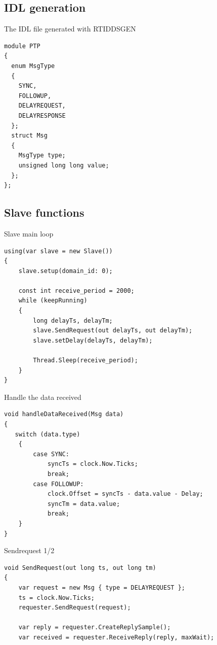 \documentclass[compressed, presentation, notheorems, 12pt]{beamer}
\begin{document}
\subsection{IDL generation}
	\begin{frame}[containsverbatim]{The IDL file generated  with RTIDDSGEN}

	\begin{lstlisting}[style=Code-C++]
module PTP
{
  enum MsgType
  {
    SYNC,
    FOLLOWUP,
    DELAYREQUEST,
    DELAYRESPONSE
  };
  struct Msg
  {
    MsgType type;         
    unsigned long long value;     
  };
};
	\end{lstlisting}
	\end{frame}



\subsection{Slave functions}

	\begin{frame}[containsverbatim]{Slave main loop}
	
	\begin{lstlisting}[style=Code-C++]
using(var slave = new Slave())
{
	slave.setup(domain_id: 0);
	
	const int receive_period = 2000; 
	while (keepRunning)
	{
		long delayTs, delayTm;
		slave.SendRequest(out delayTs, out delayTm);
		slave.setDelay(delayTs, delayTm);

		Thread.Sleep(receive_period);
	}
}
	\end{lstlisting}

	\end{frame}




	\begin{frame}[containsverbatim]{Handle the data received}
	\begin{lstlisting}[style=Code-C++]
void handleDataReceived(Msg data)
{
   switch (data.type)
	{
		case SYNC:
			syncTs = clock.Now.Ticks;
			break;
		case FOLLOWUP:
			clock.Offset = syncTs - data.value - Delay;
			syncTm = data.value;
			break;
	}
}
	\end{lstlisting}
	\end{frame}





	\begin{frame}[containsverbatim]{Sendrequest 1/2}
	\begin{lstlisting}[style=Code-C++]
void SendRequest(out long ts, out long tm)
{
	var request = new Msg { type = DELAYREQUEST };
	ts = clock.Now.Ticks;
	requester.SendRequest(request);

	var reply = requester.CreateReplySample();
	var received = requester.ReceiveReply(reply, maxWait);

	\end{lstlisting}
	\end{frame}
\end{document}
